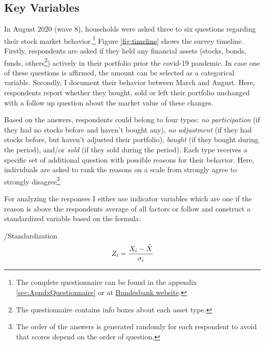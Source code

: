 \documentclass[ProjectABM]{subfiles}
\begin{document}
\subsection{Key Variables}
In August 2020 (wave 8), households were asked three to six questions regarding their stock market behavior.\footnote{The complete questionnaire can be found in the appendix \ref{sec:ApndxQuestionnaire} or at \href{https://www.bundesbank.de/en/bundesbank/research/survey-on-consumer-expectations/questionnaires-850746}{Bundesbank website}.} Figure \ref{fig:timeline} shows the survey timeline. Firstly, respondents are asked if they held any financial assets (stocks, bonds, funds, others\footnote{The questionnaire contains info boxes about each asset type.}) actively in their portfolio prior the covid-19 pandemic. In case one of these questions is affirmed, the amount can be selected as a categorical variable. Secondly, I document their behavior between March and August. Here, respondents report whether they bought, sold or left their portfolio unchanged with a follow up question about the market value of these changes. %

Based on the answers, respondents could belong to four types: \textit{no participation} (if they had no stocks before and haven't bought any), \textit{no adjustment} (if they had stocks before, but haven't adjusted their portfolio), \textit{bought} (if they bought during the period), and/or \textit{sold} (if they sold during the period). Each type receives a specific set of additional question with possible reasons for their behavior. Here, individuals are asked to rank the reasons on a scale from strongly agree to strongly disagree\footnote{The order of the answers is generated randomly for each respondent to avoid that scores depend on the order of question.}.


For analyzing the responses I either use indicator variables which are one if the reason is above the respondents average of all factors or follow \cite{choi_2020} and construct a standardized variable based on the formula:

\begin{verbatimwrite}{\EqDir/Standardization}
	\begin{align}
		Z_i = \frac{X_i - \Bar{X}}{\sigma_i}  \label{eq:standardization}
	\end{align}
\end{verbatimwrite}

\end{document}
